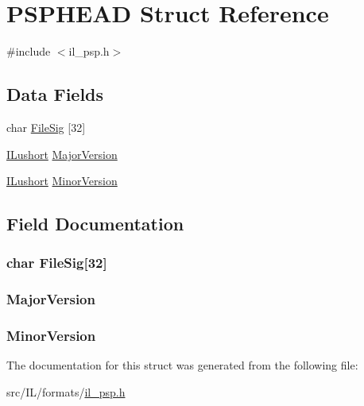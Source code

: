 \hypertarget{struct_p_s_p_h_e_a_d}{\section{P\-S\-P\-H\-E\-A\-D Struct Reference}
\label{struct_p_s_p_h_e_a_d}
}


{\ttfamily \#include $<$il\-\_\-psp.\-h$>$}

\subsection*{Data Fields}
\begin{DoxyCompactItemize}
\item 
char \hyperlink{struct_p_s_p_h_e_a_d_a766f2f2575185a8928ab7d03d4153822}{File\-Sig} \mbox{[}32\mbox{]}
\item 
\hyperlink{il_8h_af6287b43748354a7c4864da43ae56962}{I\-Lushort} \hyperlink{struct_p_s_p_h_e_a_d_ac14b488b6af91d504349d961616bbe70}{Major\-Version}
\item 
\hyperlink{il_8h_af6287b43748354a7c4864da43ae56962}{I\-Lushort} \hyperlink{struct_p_s_p_h_e_a_d_afce3b4854bbd9c4ae472f2c27b3e5c61}{Minor\-Version}
\end{DoxyCompactItemize}


\subsection{Field Documentation}
\hypertarget{struct_p_s_p_h_e_a_d_a766f2f2575185a8928ab7d03d4153822}{
\subsubsection[{File\-Sig}]{\setlength{\rightskip}{0pt plus 5cm}char File\-Sig\mbox{[}32\mbox{]}}}\label{struct_p_s_p_h_e_a_d_a766f2f2575185a8928ab7d03d4153822}
\hypertarget{struct_p_s_p_h_e_a_d_ac14b488b6af91d504349d961616bbe70}{
\subsubsection[{Major\-Version}]{ Major\-Version}}\label{struct_p_s_p_h_e_a_d_ac14b488b6af91d504349d961616bbe70}
\hypertarget{struct_p_s_p_h_e_a_d_afce3b4854bbd9c4ae472f2c27b3e5c61}{
\subsubsection[{Minor\-Version}]{ Minor\-Version}}\label{struct_p_s_p_h_e_a_d_afce3b4854bbd9c4ae472f2c27b3e5c61}


The documentation for this struct was generated from the following file\-:\begin{DoxyCompactItemize}
\item 
src/\-I\-L/formats/\hyperlink{il__psp_8h}{il\-\_\-psp.\-h}\end{DoxyCompactItemize}
